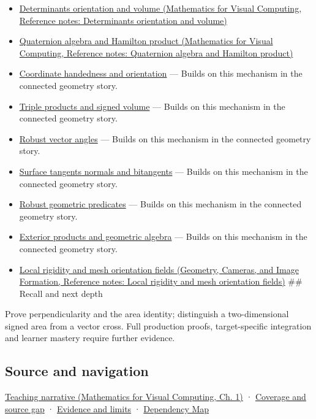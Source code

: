 \begin{itemize}
\item
  \href{../02-Mathematics-for-Visual-Computing/main.pdf\#nameddest=appendix-da478be01d02}{Determinants orientation and volume (Mathematics for Visual Computing, Reference notes: Determinants orientation and volume)}
\item
  \href{../02-Mathematics-for-Visual-Computing/main.pdf\#nameddest=appendix-965d9260eeab}{Quaternion algebra and Hamilton product (Mathematics for Visual Computing, Reference notes: Quaternion algebra and Hamilton product)}
\item
  \hyperref[appendix-87d7626c8d37]{Coordinate handedness and orientation} --- Builds on this mechanism in the connected geometry story.
\item
  \hyperref[appendix-5caa058bd9c7]{Triple products and signed volume} --- Builds on this mechanism in the connected geometry story.
\item
  \hyperref[appendix-e569e60e18e6]{Robust vector angles} --- Builds on this mechanism in the connected geometry story.
\item
  \hyperref[appendix-e31893dec985]{Surface tangents normals and bitangents} --- Builds on this mechanism in the connected geometry story.
\item
  \hyperref[appendix-341296fb3f64]{Robust geometric predicates} --- Builds on this mechanism in the connected geometry story.
\item
  \hyperref[appendix-e1960925d1b8]{Exterior products and geometric algebra} --- Builds on this mechanism in the connected geometry story.
\item
  \href{../03-Geometry-Cameras-and-Image-Formation/main.pdf\#nameddest=appendix-7107009c505b}{Local rigidity and mesh orientation fields (Geometry, Cameras, and Image Formation, Reference notes: Local rigidity and mesh orientation fields)} \#\# Recall and next depth
\end{itemize}

Prove perpendicularity and the area identity; distinguish a two-dimensional signed area from a vector cross. Full production proofs, target-specific integration and learner mastery require further evidence.

\subsection{Source and navigation}\label{appendix-2391db8052b1-source-and-navigation}

\href{../02-Mathematics-for-Visual-Computing/main.pdf\#nameddest=01-foundations-i-ch017-oriented-area-tells-us-which-side-of-the-panel-is-front}{Teaching narrative (Mathematics for Visual Computing, Ch. 1)} · \hyperref[appendix-fd090d982a15-phase-6---parts-501-600]{Coverage and source gap} · \hyperref[appendix-a103e7846d21-phase-6---source-analysis-and-verification]{Evidence and limits} · \hyperref[appendix-4ad47bdd269a]{Dependency Map}
